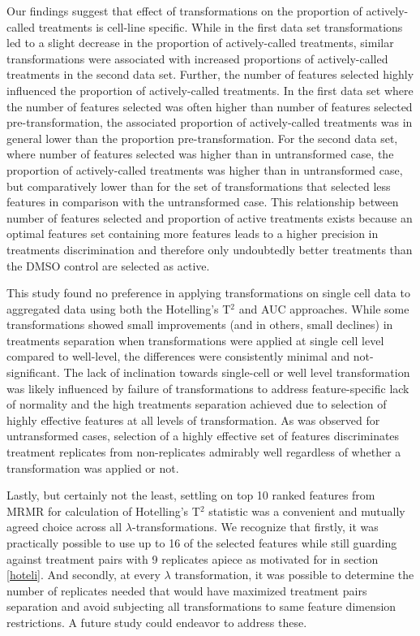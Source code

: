 \documentclass[11pt]{article}
\begin{document}
\par{Our findings suggest that effect of transformations on the proportion of actively-called treatments is cell-line specific. While in the first data set transformations led to a slight decrease in the proportion of actively-called treatments, similar transformations were associated with increased proportions of actively-called treatments in the second data set. Further, the number of features selected highly influenced the proportion of actively-called treatments. In the first data set where the number of features selected was often higher than number of features selected pre-transformation, the associated proportion of actively-called treatments was in general lower than the proportion pre-transformation. For the second data set, where number of features selected was higher than in untransformed case, the proportion of actively-called treatments was higher than in untransformed case, but comparatively lower than for the set of transformations that selected less features in comparison with the untransformed case. This relationship between number of features selected and proportion of active treatments exists because an optimal features set containing more features leads to a higher precision in treatments discrimination and therefore only undoubtedly better treatments than the DMSO control are selected as active.}

\par{This study found no preference in applying transformations on single cell data to aggregated data using both the Hotelling's T$^2$ and AUC approaches. While some transformations showed small improvements (and in others, small declines) in treatments separation when transformations were applied at single cell level compared to well-level, the differences were consistently minimal and not-significant. The lack of inclination towards single-cell or well level transformation was likely influenced by failure of transformations to address feature-specific lack of normality and the high treatments separation achieved due to selection of highly effective features at all levels of transformation. As was observed for untransformed cases, selection of a highly effective set of features discriminates treatment replicates from non-replicates admirably well regardless of whether a transformation was applied or not. }
\par{Lastly, but certainly not the least, settling on top 10 ranked features from MRMR for calculation of Hotelling's T$^2$ statistic was a convenient and mutually agreed choice across all $\lambda$-transformations. We recognize that firstly, it was practically possible to use up to 16 of the selected features while still guarding against treatment pairs with 9 replicates apiece as motivated for in section \ref{hoteli}. And secondly, at every $\lambda$ transformation, it was possible to determine the number of replicates needed that would have maximized treatment pairs separation and avoid subjecting all transformations to same feature dimension restrictions. A future study could endeavor to address these.}
\clearpage


% 
\clearpage
\end{document}
